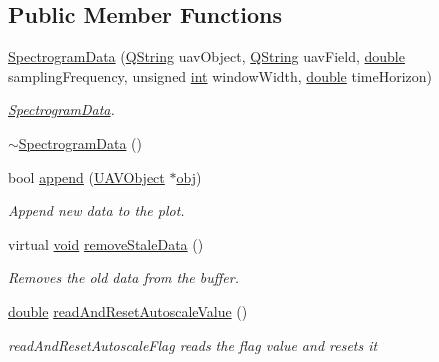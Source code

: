 \subsection*{Public Member Functions}
\begin{DoxyCompactItemize}
\item 
\hyperlink{group___scope_plugin_gaaac18b4298b3bb722d59928336254cd1}{Spectrogram\-Data} (\hyperlink{group___u_a_v_objects_plugin_gab9d252f49c333c94a72f97ce3105a32d}{Q\-String} uav\-Object, \hyperlink{group___u_a_v_objects_plugin_gab9d252f49c333c94a72f97ce3105a32d}{Q\-String} uav\-Field, \hyperlink{_super_l_u_support_8h_a8956b2b9f49bf918deed98379d159ca7}{double} sampling\-Frequency, unsigned \hyperlink{ioapi_8h_a787fa3cf048117ba7123753c1e74fcd6}{int} window\-Width, \hyperlink{_super_l_u_support_8h_a8956b2b9f49bf918deed98379d159ca7}{double} time\-Horizon)
\begin{DoxyCompactList}\small\item\em \hyperlink{class_spectrogram_data}{Spectrogram\-Data}. \end{DoxyCompactList}\item 
\hyperlink{group___scope_plugin_gafe709b6e448db73f8548bc2b76f27d19}{$\sim$\-Spectrogram\-Data} ()
\item 
bool \hyperlink{group___scope_plugin_gab2c059e5c5dea398eed663062df84fb6}{append} (\hyperlink{class_u_a_v_object}{U\-A\-V\-Object} $\ast$\hyperlink{glext_8h_a0c0d4701a6c89f4f7f0640715d27ab26}{obj})
\begin{DoxyCompactList}\small\item\em Append new data to the plot. \end{DoxyCompactList}\item 
virtual \hyperlink{group___u_a_v_objects_plugin_ga444cf2ff3f0ecbe028adce838d373f5c}{void} \hyperlink{group___scope_plugin_ga6e71a34a3e6d00b99845ac4cdfabdde9}{remove\-Stale\-Data} ()
\begin{DoxyCompactList}\small\item\em Removes the old data from the buffer. \end{DoxyCompactList}\item 
\hyperlink{_super_l_u_support_8h_a8956b2b9f49bf918deed98379d159ca7}{double} \hyperlink{group___scope_plugin_ga5adb8d57b4829f746f7437380b663d72}{read\-And\-Reset\-Autoscale\-Value} ()
\begin{DoxyCompactList}\small\item\em read\-And\-Reset\-Autoscale\-Flag reads the flag value and resets it \end{DoxyCompactList}\item 

\end{DoxyCompactItemize}
